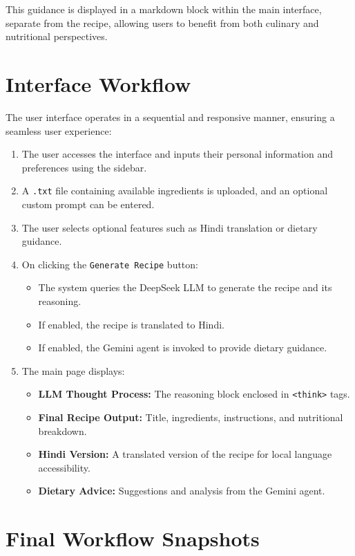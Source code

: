 \documentclass[letterpaper,11pt]{report}
\begin{document}
This guidance is displayed in a markdown block within the main interface, separate from the recipe, allowing users to benefit from both culinary and nutritional perspectives.

\section{Interface Workflow}

The user interface operates in a sequential and responsive manner, ensuring a seamless user experience:

\begin{enumerate}
  \item The user accesses the interface and inputs their personal information and preferences using the sidebar.
  \item A \texttt{.txt} file containing available ingredients is uploaded, and an optional custom prompt can be entered.
  \item The user selects optional features such as Hindi translation or dietary guidance.
  \item On clicking the \texttt{Generate Recipe} button:
  \begin{itemize}
    \item The system queries the DeepSeek LLM to generate the recipe and its reasoning.
    \item If enabled, the recipe is translated to Hindi.
    \item If enabled, the Gemini agent is invoked to provide dietary guidance.
  \end{itemize}
  \item The main page displays:
  \begin{itemize}
    \item \textbf{LLM Thought Process:} The reasoning block enclosed in \texttt{<think>} tags.
    \item \textbf{Final Recipe Output:} Title, ingredients, instructions, and nutritional breakdown.
    \item \textbf{Hindi Version:} A translated version of the recipe for local language accessibility.
    \item \textbf{Dietary Advice:} Suggestions and analysis from the Gemini agent.
  \end{itemize}
\end{enumerate}

\newpage
\section{Final Workflow Snapshots}
\end{document}
